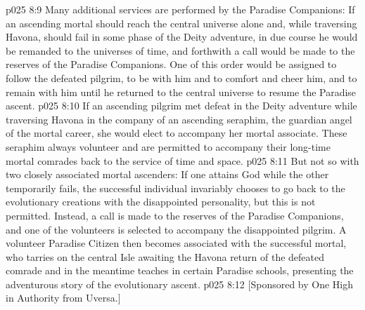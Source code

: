 \vs p025 8:9 \pc Many additional services are performed by the Paradise Companions: If an ascending mortal should reach the central universe alone and, while traversing Havona, should fail in some phase of the Deity adventure, in due course he would be remanded to the universes of time, and forthwith a call would be made to the reserves of the Paradise Companions. One of this order would be assigned to follow the defeated pilgrim, to be with him and to comfort and cheer him, and to remain with him until he returned to the central universe to resume the Paradise ascent.
\vs p025 8:10 If an ascending pilgrim met defeat in the Deity adventure while traversing Havona in the company of an ascending seraphim, the guardian angel of the mortal career, she would elect to accompany her mortal associate. These seraphim always volunteer and are permitted to accompany their long\hyp{}time mortal comrades back to the service of time and space.
\vs p025 8:11 But not so with two closely associated mortal ascenders: If one attains God while the other temporarily fails, the successful individual invariably chooses to go back to the evolutionary creations with the disappointed personality, but this is not permitted. Instead, a call is made to the reserves of the Paradise Companions, and one of the volunteers is selected to accompany the disappointed pilgrim. A volunteer Paradise Citizen then becomes associated with the successful mortal, who tarries on the central Isle awaiting the Havona return of the defeated comrade and in the meantime teaches in certain Paradise schools, presenting the adventurous story of the evolutionary ascent.
\vsetoff
\vs p025 8:12 [Sponsored by One High in Authority from Uversa.]
\quizlink

